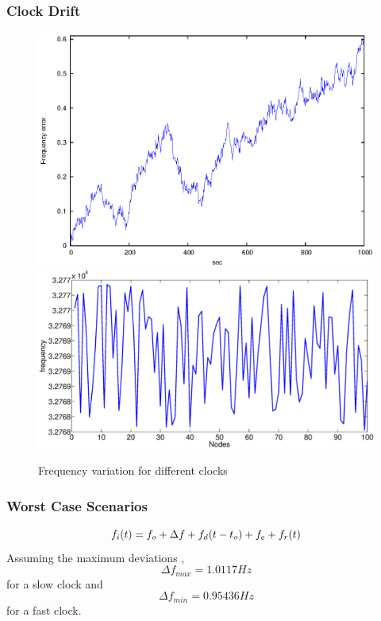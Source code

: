 \documentclass[t]{beamer}
\begin{document}
\begin{frame}
\frametitle{Clock Drift}
\begin{figure}
\centering
\includegraphics[width= 0.75 \textwidth]{freq_var}
\includegraphics[width= 0.75 \textwidth]{frequency_error}
\caption{Frequency variation for different clocks}
\end{figure}
\end{frame}


\begin{frame}
\frametitle{Worst Case Scenarios}
\begin{equation}
    \centering
f_i(t) = f_o + \Delta f + f_d(t-t_o) + f_e + f_r(t)
\end{equation}
Assuming the maximum deviations ,
\begin{equation}
\Delta f_{max} = 1.0117 Hz
\end{equation}
for a slow clock and
\begin{equation}
 \Delta f_{min} = 0.95436 Hz
\end{equation}
for a fast clock.
\end{frame}
\end{document}

